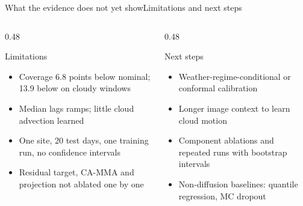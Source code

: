 \documentclass[aspectratio=169,11pt]{beamer}
\begin{document}
\begin{frame}{What the evidence does not yet show}{Limitations and next steps}
\begin{columns}[T]
\begin{column}{0.48\textwidth}
\begin{card}{Limitations}\small
\begin{itemize}
\item Coverage 6.8 points below nominal; 13.9 below on cloudy windows
\item Median lags ramps; little cloud advection learned
\item One site, 20 test days, one training run, no confidence intervals
\item Residual target, CA-MMA and projection not ablated one by one
\end{itemize}
\end{card}
\end{column}
\begin{column}{0.48\textwidth}
\begin{card}{Next steps}\small
\begin{itemize}
\item Weather-regime-conditional or conformal calibration
\item Longer image context to learn cloud motion
\item Component ablations and repeated runs with bootstrap intervals
\item Non-diffusion baselines: quantile regression, MC dropout
\end{itemize}
\end{card}
\end{column}
\end{columns}
\end{frame}
\end{document}
